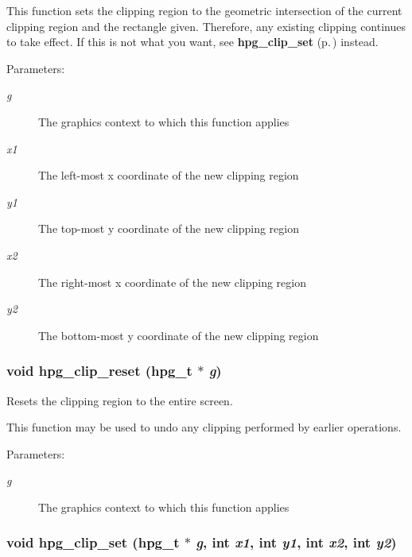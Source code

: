 This function sets the clipping region to the geometric intersection of the current clipping region and the rectangle given. Therefore, any existing clipping continues to take effect. If this is not what you want, see {\bf hpg\_\-clip\_\-set} {\rm (p.\,\pageref{hpgraphics_8h_a36})} instead.\begin{Desc}
\item[Parameters: ]\par
\begin{description}
\item[{\em 
g}]The graphics context to which this function applies \item[{\em 
x1}]The left-most x coordinate of the new clipping region \item[{\em 
y1}]The top-most y coordinate of the new clipping region \item[{\em 
x2}]The right-most x coordinate of the new clipping region \item[{\em 
y2}]The bottom-most y coordinate of the new clipping region \end{description}
\end{Desc}
\subsubsection{\setlength{\rightskip}{0pt plus 5cm}void hpg\_\-clip\_\-reset ({\bf hpg\_\-t} $\ast$ {\em g})}\label{hpgraphics_8h_a35}


Resets the clipping region to the entire screen.

This function may be used to undo any clipping performed by earlier operations.\begin{Desc}
\item[Parameters: ]\par
\begin{description}
\item[{\em 
g}]The graphics context to which this function applies \end{description}
\end{Desc}
\subsubsection{\setlength{\rightskip}{0pt plus 5cm}void hpg\_\-clip\_\-set ({\bf hpg\_\-t} $\ast$ {\em g}, int {\em x1}, int {\em y1}, int {\em x2}, int {\em y2})}\label{hpgraphics_8h_a36}


